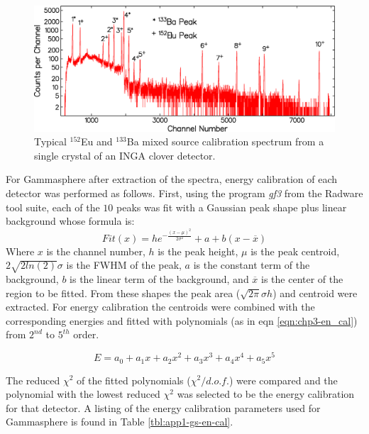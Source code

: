 \begin{figure}[h!]
	\centerline{\includegraphics[height=0.25\textheight]{./img/c3/inga_crystal_en_cal.eps}}
	\caption{Typical $^{152}$Eu and $^{133}$Ba mixed source calibration spectrum from a single crystal of an INGA clover detector.}
	\label{fig:chp3-inga-cal-spec}
\end{figure}

For Gammasphere after extraction of the spectra, energy calibration of each detector was performed as follows. First, using the program \emph{gf3} from the Radware tool suite\cite{radware}, each of the $10$ peaks was fit with a Gaussian peak shape plus linear background whose formula is:
\begin{equation}
\label{eqn:chp3-pk_fit} 
Fit(x) = h e^{-\frac{(x-\mu{})^2}{2\sigma{}^2}} + a + b (x-\overline{x})
\end{equation}
 Where $x$ is the channel number, $h$ is the peak height, $\mu{}$ is the peak centroid, $2\sqrt{2ln(2)}\sigma{}$ is the FWHM of the peak, $a$ is the constant term of the background, $b$ is the linear term of the background, and $\overline{x}$ is the center of the region to be fitted. From these shapes the peak area ($\sqrt{2\pi{}}\sigma{}h$) and centroid were extracted. For energy calibration the centroids were combined with the corresponding energies and fitted with polynomials (as in eqn \ref{eqn:chp3-en_cal}) from $2^{nd}$ to $5^{th}$ order.

\begin{equation}
\label{eqn:chp3-en_cal} 
E = a_0 + a_1x + a_2x^2 + a_3x^3 + a_4x^4 + a_5x^5
\end{equation}

The reduced $\chi{}^2$ of the fitted polynomials ($\chi^2/d.o.f.$) were compared and the polynomial with the lowest reduced $\chi{}^2$ was selected to be the energy calibration for that detector. A listing of the energy calibration parameters used for Gammasphere is found in Table \ref{tbl:app1-gs-en-cal}.

